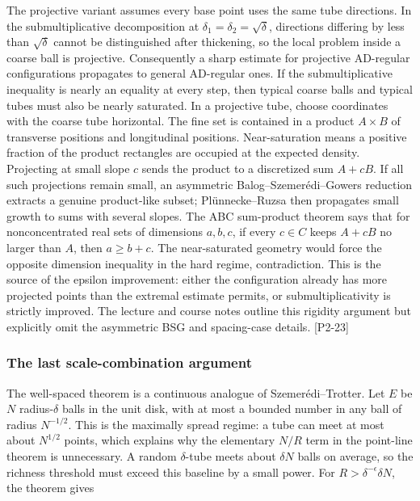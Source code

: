 The projective variant assumes every base point uses the same tube directions. In the submultiplicative decomposition at \(\delta_1=\delta_2=\sqrt\delta\), directions differing by less than \(\sqrt\delta\) cannot be distinguished after thickening, so the local problem inside a coarse ball is projective. Consequently a sharp estimate for projective AD-regular configurations propagates to general AD-regular ones. If the submultiplicative inequality is nearly an equality at every step, then typical coarse balls and typical tubes must also be nearly saturated. In a projective tube, choose coordinates with the coarse tube horizontal. The fine set is contained in a product \(A\times B\) of transverse positions and longitudinal positions. Near-saturation means a positive fraction of the product rectangles are occupied at the expected density. Projecting at small slope \(c\) sends the product to a discretized sum \(A+cB\). If all such projections remain small, an asymmetric Balog--Szemerédi--Gowers reduction extracts a genuine product-like subset; Plünnecke--Ruzsa then propagates small growth to sums with several slopes. The ABC sum-product theorem says that for nonconcentrated real sets of dimensions \(a,b,c\), if every \(c\in C\) keeps \(A+cB\) no larger than \(A\), then \(a\ge b+c\). The near-saturated geometry would force the opposite dimension inequality in the hard regime, contradiction. This is the source of the epsilon improvement: either the configuration already has more projected points than the extremal estimate permits, or submultiplicativity is strictly improved. The lecture and course notes outline this rigidity argument but explicitly omit the asymmetric BSG and spacing-case details. {[}P2-23{]}

\subsubsection{The last scale-combination argument}\label{04-visual-computing-ii-ch033-the-last-scale-combination-argument}

The well-spaced theorem is a continuous analogue of Szemerédi--Trotter. Let \(E\) be \(N\) radius-\(\delta\) balls in the unit disk, with at most a bounded number in any ball of radius \(N^{-1/2}\). This is the maximally spread regime: a tube can meet at most about \(N^{1/2}\) points, which explains why the elementary \(N/R\) term in the point-line theorem is unnecessary. A random \(\delta\)-tube meets about \(\delta N\) balls on average, so the richness threshold must exceed this baseline by a small power. For \(R>\delta^{-\epsilon}\delta N\), the theorem gives

